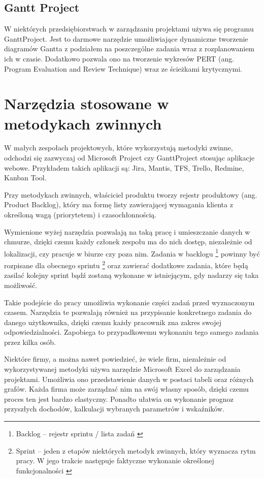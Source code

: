 \subsection{Gantt Project}

W niektórych przedsiębiorstwach w zarządzaniu projektami używa się programu GanttProject.
Jest to darmowe narzędzie umożliwiające dynamiczne tworzenie diagramów Gantta
z podziałem na poszczególne zadania wraz z rozplanowaniem ich w czasie.
Dodatkowo pozwala ono na tworzenie wykresów PERT (ang. Program Evaluation and Review Technique)
wraz ze ścieżkami krytycznymi.
\cite{Trendy_Zarzadzanie}


\section{Narzędzia stosowane w metodykach zwinnych}

W małych zespołach projektowych, które wykorzystują metodyki zwinne,
odchodzi się zazwyczaj od Microsoft Project czy GanttProject stosując aplikacje webowe.
Przykładem takich aplikacji są: Jira, Mantis, TFS, Trello, Redmine, Kanban Tool.

Przy metodykach zwinnych, właściciel produktu tworzy rejestr produktowy (ang. Product Backlog),
który ma formę listy zawierającej wymagania klienta z określoną wagą (priorytetem) i czasochłonnością.
\cite{Shwaber_2004}

Wymienione wyżej narzędzia pozwalają na taką pracę i umieszczanie danych w chmurze,
dzięki czemu każdy członek zespołu ma do nich dostęp,
niezależnie od lokalizacji, czy pracuje w biurze czy poza nim.
Zadania w backlogu
\footnote{Backlog – rejestr sprintu / lista zadań \cite{metody_zwinne_2016}}
powinny być rozpisane dla obecnego sprintu
\footnote{Sprint – jeden z etapów niektórych metodyk zwinnych, który wyznacza rytm pracy. W jego
trakcie następuje faktyczne wykonanie określonej funkcjonalności \cite{Samoorganizacja_2010}}
oraz zawierać dodatkowe zadania, które będą zasilać kolejny sprint bądź zostaną wykonane w istniejącym,
gdy nadarzy się taka możliwość.

Takie podejście do pracy umożliwia wykonanie części zadań przed wyznaczonym czasem.
Narzędzia te pozwalają również na przypisanie konkretnego zadania do danego użytkownika,
dzięki czemu każdy pracownik zna zakres swojej odpowiedzialności.
Zapobiega to przypadkowemu wykonaniu tego samego zadania przez kilka osób.

Niektóre firmy, a można nawet powiedzieć, że wiele firm,
niezależnie od wykorzystywanej metodyki używa narzędzie Microsoft Excel do zarządzania projektami.
Umożliwia ono przedstawienie danych w postaci tabeli oraz różnych grafów.
Każda firma może zarządzać nim na swój własny sposób, dzięki czemu proces ten jest bardzo elastyczny.
Ponadto ułatwia on wykonanie prognoz przyszłych dochodów, kalkulacji wybranych parametrów i wskaźników.

